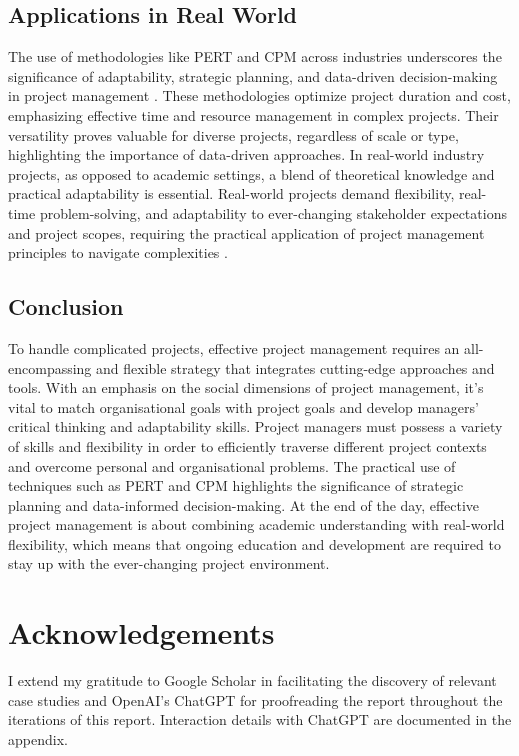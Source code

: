 \documentclass{article}
\begin{document}
\subsection{Applications in Real World}
The use of methodologies like PERT and CPM across industries underscores the significance of adaptability, strategic planning, and data-driven decision-making in project management \cite{cicmil2006rethinking}. These methodologies optimize project duration and cost, emphasizing effective time and resource management in complex projects. Their versatility proves valuable for diverse projects, regardless of scale or type, highlighting the importance of data-driven approaches. In real-world industry projects, as opposed to academic settings, a blend of theoretical knowledge and practical adaptability is essential. Real-world projects demand flexibility, real-time problem-solving, and adaptability to ever-changing stakeholder expectations and project scopes, requiring the practical application of project management principles to navigate complexities \cite{toor2009ineffective}.

\subsection{Conclusion}

To handle complicated projects, effective project management requires an all-encompassing and flexible strategy that integrates cutting-edge approaches and tools. With an emphasis on the social dimensions of project management, it's vital to match organisational goals with project goals and develop managers' critical thinking and adaptability skills. Project managers must possess a variety of skills and flexibility in order to efficiently traverse different project contexts and overcome personal and organisational problems. The practical use of techniques such as PERT and CPM highlights the significance of strategic planning and data-informed decision-making. At the end of the day, effective project management is about combining academic understanding with real-world flexibility, which means that ongoing education and development are required to stay up with the ever-changing project environment.






\section*{Acknowledgements}
I extend my gratitude to Google Scholar in facilitating the discovery of relevant case studies and OpenAI's ChatGPT for proofreading the report throughout the iterations of this report. Interaction details with ChatGPT are documented in the appendix.
\end{document}
